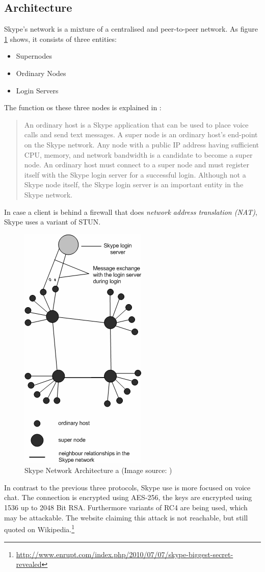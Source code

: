 \subsection{Architecture}
Skype's network is a mixture of a centralised and peer-to-peer network.
As figure \ref{skypearch} shows, it consists of three entities:
\begin{itemize}
\item Supernodes
\item Ordinary Nodes
\item Login Servers
\end{itemize}
The function os these three nodes is explained in \cite{skype-analysis}:
\begin{quote}
An ordinary host is
a Skype application that can be used to place voice calls and send
text messages. A super node is an ordinary host’s end-point on the
Skype network. Any node with a public IP address having
sufficient CPU, memory, and network bandwidth is a candidate to
become a super node. An ordinary host must connect to a super
node and must register itself with the Skype login server for a
successful login. Although not a Skype node itself, the Skype
login server is an important entity in the Skype network.
\end{quote}
In case a client is behind a firewall that does
\textit{network address translation (NAT)}, 
Skype uses a variant of STUN\cite{rfc5389}.
\begin{figure}
    \centering
    \caption[Skype Network Architecture]{Skype Network Architecture a (Image source: \cite{skype-analysis})}
    \label{skypearch}
    \includegraphics[scale=0.8]{skype-network.png}
\end{figure}
In contrast to the previous three protocols, Skype use is more focused on voice chat.
The connection is encrypted using AES-256, the keys are encrypted using
1536 up to 2048 Bit RSA.
Furthermore variants of RC4 are being used, which may be attackable.
The website claiming this attack is not reachable, but still quoted
on Wikipedia.\footnote{\url{http://www.enrupt.com/index.php/2010/07/07/skype-biggest-secret-revealed}}

